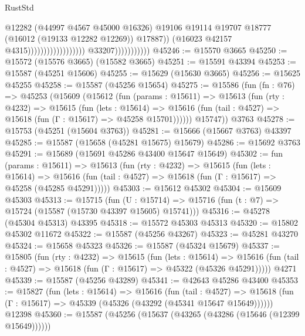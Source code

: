 \begin{lexlean}{RustStd}
\begin{coremodule}
                                                                @12282
                                                                (@44997 @4567 @45000 @16326)
                                                                @19106
                                                                @19114
                                                                @19707
                                                                @18777
                                                                (@16012 (@19133 @12282 @12269))
                                                                @17887))
                                                            (@16023 @42157 @4315))))))))))))))))))
                          @33207)))))))))))
@45246 := @15570 @3665
@45250 := @15572 (@15576 @3665) (@15582 @3665)
@45251 := @15591 @43394
@45253 := @15587 (@45251 @15606)
@45255 := @15629 (@15630 @3665)
@45256 := @15625 @45255
@45258 := @15587 (@45256 @15654)
@45275 := @15586
    (fun (fn : @76) =>
    @45253
      (@15609
        (@15612
          (fun (params : @15611) =>
          @15613
            (fun (rty : @4232) =>
            @15615
              (fun (lets : @15614) =>
              @15616 (fun (tail : @4527) => @15618 (fun (Γ : @15617) => @45258 @15701))))))
        @15747))
    @3763
@45278 := @15753 (@45251 (@15604 @3763))
@45281 := @15666 (@15667 @3763) @43397
@45285 := @15587 (@15658 (@45281 @15675) @15679)
@45286 := @15692 @3763
@45291 := @15689 (@15691 @45286 @43400 @15647 @15649)
@45302 := fun (params : @15611) =>
  @15613
    (fun (rty : @4232) =>
    @15615
      (fun (lets : @15614) =>
      @15616 (fun (tail : @4527) => @15618 (fun (Γ : @15617) => @45258 (@45285 @45291)))))
@45303 := @15612 @45302
@45304 := @15609 @45303
@45313 := @15715
    (fun (U : @15714) => @15716 (fun (t : @7) => @15724 (@15587 (@15730 @43397 @15605) @15741)))
@45316 := @45278 (@45304 @45313) @43395
@45318 := @15572 @45303 @45313
@45320 := @15802 @45302 @11672
@45322 := @15587 (@45256 @43267)
@45323 := @45281 @43270
@45324 := @15658 @45323
@45326 := @15587 (@45324 @15679)
@45337 := @15805
    (fun (rty : @4232) =>
    @15615
      (fun (lets : @15614) =>
      @15616 (fun (tail : @4527) => @15618 (fun (Γ : @15617) => @45322 (@45326 @45291)))))
    @4271
@45339 := @15587 (@45256 @43289)
@45341 := @42643 @45286 @43400
@45353 := @15827
    (fun (lets : @15614) =>
    @15616
      (fun (tail : @4527) =>
      @15618 (fun (Γ : @15617) => @45339 (@45326 (@43292 (@45341 @15647 @15649))))))
    @12398
@45360 := @15587 (@45256 (@15637 (@43265 (@43286 (@15646 (@12399 @15649))))))

\end{coremodule}
\end{lexlean}
